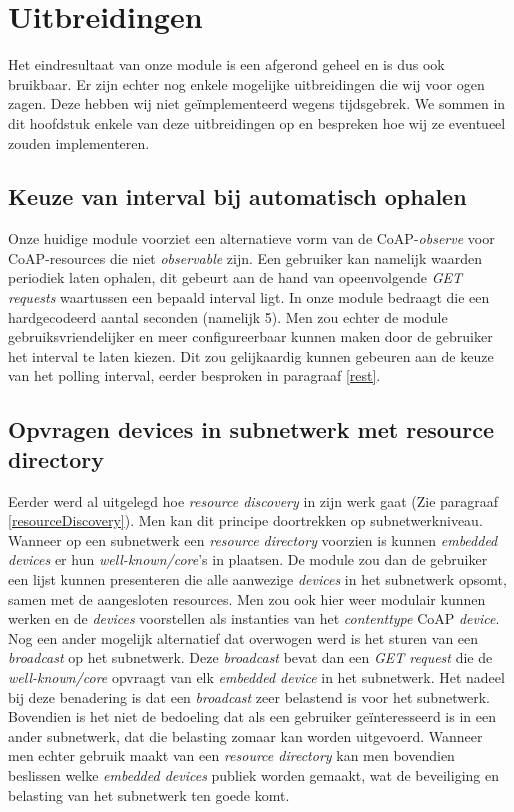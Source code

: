 \chapter{Uitbreidingen} \label{uitbreidingen}

Het eindresultaat van onze module is een afgerond geheel en is dus ook bruikbaar. Er zijn echter nog enkele mogelijke uitbreidingen die wij voor ogen zagen. Deze hebben wij niet ge\"{i}mplementeerd wegens tijdsgebrek. We sommen in dit hoofdstuk enkele van deze uitbreidingen op en bespreken hoe wij ze eventueel zouden implementeren.

\section{Keuze van interval bij automatisch ophalen}
Onze huidige module voorziet een alternatieve vorm van de CoAP-\textit{observe} voor CoAP-resources die niet \textit{observable} zijn. Een gebruiker kan namelijk waarden periodiek laten ophalen, dit gebeurt aan de hand van opeenvolgende \textit{GET requests} waartussen een bepaald interval ligt. In onze module bedraagt die een hardgecodeerd aantal seconden (namelijk 5). Men zou echter de module gebruiksvriendelijker en meer configureerbaar kunnen maken door de gebruiker het interval te laten kiezen. Dit zou gelijkaardig kunnen gebeuren aan de keuze van het polling interval, eerder besproken in paragraaf \ref{rest}.

\section{Opvragen devices in subnetwerk met resource directory} \label{resourceDirectory}
Eerder werd al uitgelegd hoe \textit{resource discovery} in zijn werk gaat (Zie paragraaf \ref{resourceDiscovery}). Men kan dit principe doortrekken op subnetwerkniveau. Wanneer op een subnetwerk een \textit{resource directory} voorzien is
kunnen \textit{embedded devices} er hun \textit{well-known/core}'s in plaatsen. De module zou dan de gebruiker een lijst kunnen presenteren die alle aanwezige \textit{devices} in het subnetwerk opsomt, samen met de aangesloten resources. Men zou ook hier weer modulair kunnen werken en de \textit{devices} voorstellen als instanties van het \textit{contenttype} CoAP \textit{device}.\\

Nog een ander mogelijk alternatief dat overwogen werd is het sturen van een \textit{broadcast} op het subnetwerk. Deze \textit{broadcast} bevat dan een \textit{GET request} die de \textit{well-known/core} opvraagt van elk \textit{embedded device} in het subnetwerk. Het nadeel bij deze benadering is dat een \textit{broadcast} zeer belastend is voor het subnetwerk. Bovendien is het niet de bedoeling dat als een gebruiker ge\"{i}nteresseerd is in een ander subnetwerk, dat die belasting zomaar kan worden uitgevoerd. Wanneer men echter gebruik maakt van een \textit{resource directory} kan men bovendien beslissen welke \textit{embedded devices} publiek worden gemaakt, wat de beveiliging en belasting van het subnetwerk ten goede komt.

